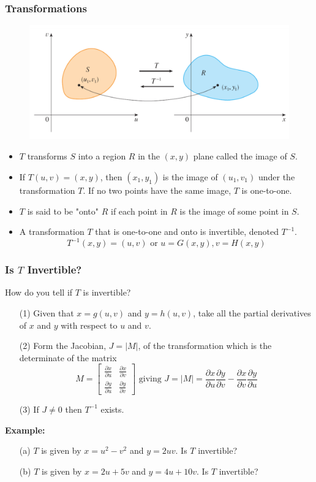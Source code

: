 \documentclass{beamer}
\begin{document}
\begin{frame}
\frametitle{Transformations}
\begin{figure}
	\includegraphics[width=.9\textheight]{vmap.png}\\
	\hspace*{10pt}\hbox{}
\end{figure}

\begin{itemize}
	\item $T$ transforms $S$ into a region $R$ in the $(x,y)$ plane called the image of $S$.
		\item If $T(u,v) = (x,y)$, then $(x_1,y_1)$ is the image of $(u_1,v_1)$ under the transformation $T$. If no two points have the same image, $T$ is one-to-one.
	\item $T$ is said to be "onto" $R$ if each point in $R$ is the image of some point in $S$.
	\item A transformation $T$ that is one-to-one and onto is invertible, denoted $T^{-1}$.
	$$T^{-1}(x,y) = (u,v) \mbox { or } u = G(x,y), v=H(x,y)$$
\end{itemize}
\end{frame}

\begin{frame}
\frametitle{Is $T$ Invertible?}
How do you tell if $T$ is invertible?
\begin{itemize}
	\item[(1)] Given that $x = g(u,v)$ and $y=h(u,v)$, take all the partial derivatives of $x$ and $y$ with respect to $u$ and $v$.
	\item[(2)] Form the Jacobian, $J = |M|$, of the transformation which is the determinate of the matrix
	$$M = \begin{bmatrix}
		\frac{\partial x}{\partial u} & 	\frac{\partial x}{\partial v}\\
			\frac{\partial y}{\partial u} & 	\frac{\partial y}{\partial v}
	\end{bmatrix} \mbox{ giving } J=|M| = \frac{\partial x}{\partial u} \frac{\partial y}{\partial v}-	\frac{\partial x}{\partial v}\frac{\partial y}{\partial u} $$
	\item[(3)] If $J \neq 0$ then $T^{-1}$ exists.
\end{itemize}
\textbf{Example:}
\begin{itemize}
	\item[(a)] $T$ is given by $x=u^2-v^2$ and $y=2uv$. Is $T$ invertible?
	\item[(b)] $T$ is given by $x=2u+5v$ and $y=4u + 10v$. Is $T$ invertible?
\end{itemize}
\end{frame}
\end{document}
